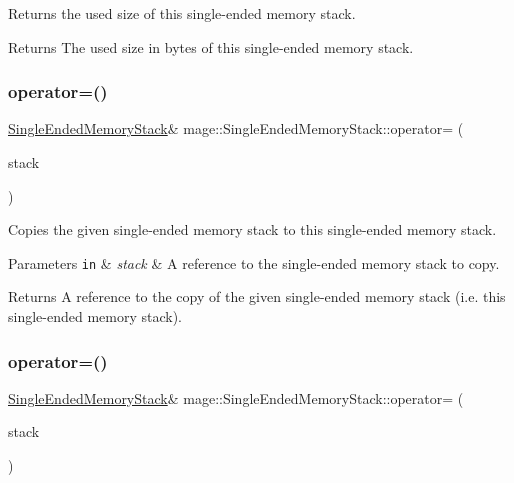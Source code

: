 Returns the used size of this single-\/ended memory stack.

\begin{DoxyReturn}{Returns}
The used size in bytes of this single-\/ended memory stack. 
\end{DoxyReturn}
\hypertarget{classmage_1_1_single_ended_memory_stack_a709db7d21cd2db6e98acd7985770468e}{}\label{classmage_1_1_single_ended_memory_stack_a709db7d21cd2db6e98acd7985770468e} 
\subsubsection{\texorpdfstring{operator=()}{operator=()}\hspace{0.1cm}{\footnotesize\ttfamily [1/2]}}
{\footnotesize\ttfamily \hyperlink{classmage_1_1_single_ended_memory_stack}{Single\+Ended\+Memory\+Stack}\& mage\+::\+Single\+Ended\+Memory\+Stack\+::operator= (\begin{DoxyParamCaption}\item[{const \hyperlink{classmage_1_1_single_ended_memory_stack}{Single\+Ended\+Memory\+Stack} \&}]{stack }\end{DoxyParamCaption})\hspace{0.3cm}{\ttfamily [delete]}}

Copies the given single-\/ended memory stack to this single-\/ended memory stack.


\begin{DoxyParams}[1]{Parameters}
\mbox{\tt in}  & {\em stack} & A reference to the single-\/ended memory stack to copy. \\
\hline
\end{DoxyParams}
\begin{DoxyReturn}{Returns}
A reference to the copy of the given single-\/ended memory stack (i.\+e. this single-\/ended memory stack). 
\end{DoxyReturn}
\hypertarget{classmage_1_1_single_ended_memory_stack_a24613dc91ab6577aa57fbd55a4c81023}{}\label{classmage_1_1_single_ended_memory_stack_a24613dc91ab6577aa57fbd55a4c81023} 
\subsubsection{\texorpdfstring{operator=()}{operator=()}\hspace{0.1cm}{\footnotesize\ttfamily [2/2]}}
{\footnotesize\ttfamily \hyperlink{classmage_1_1_single_ended_memory_stack}{Single\+Ended\+Memory\+Stack}\& mage\+::\+Single\+Ended\+Memory\+Stack\+::operator= (\begin{DoxyParamCaption}\item[{\hyperlink{classmage_1_1_single_ended_memory_stack}{Single\+Ended\+Memory\+Stack} \&\&}]{stack }\end{DoxyParamCaption})\hspace{0.3cm}{\ttfamily [delete]}}

